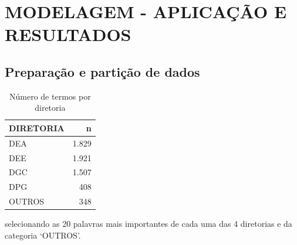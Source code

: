 \documentclass[]{article}
\newenvironment{Shaded}{\begin{snugshade}}{\end{snugshade}}
\newcommand{\KeywordTok}[1]{\textcolor[rgb]{0.13,0.29,0.53}{\textbf{#1}}}
\newcommand{\DataTypeTok}[1]{\textcolor[rgb]{0.13,0.29,0.53}{#1}}
\newcommand{\StringTok}[1]{\textcolor[rgb]{0.31,0.60,0.02}{#1}}
\newcommand{\OperatorTok}[1]{\textcolor[rgb]{0.81,0.36,0.00}{\textbf{#1}}}
\newcommand{\NormalTok}[1]{#1}
\begin{document}
\section{MODELAGEM - APLICAÇÃO E
RESULTADOS}\label{modelagem---aplicacao-e-resultados}

\subsection{Preparação e partição de
dados}\label{preparacao-e-particao-de-dados}

\begin{Shaded}
\end{Shaded}

\begin{table}[!h]

\caption{\label{tab:unnamed-chunk-73}Número de termos por diretoria}
\centering
\begin{tabular}{lr}
\toprule
DIRETORIA & n\\
\midrule
\rowcolor{gray!6}  DEA & 1.829\\
DEE & 1.921\\
\rowcolor{gray!6}  DGC & 1.507\\
DPG & 408\\
\rowcolor{gray!6}  OUTROS & 348\\
\bottomrule
\end{tabular}
\end{table}

selecionando as 20 palavras mais importantes de cada uma das 4
diretorias e da categoria `OUTROS'.
\end{document}
